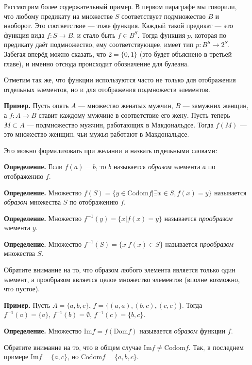 Рассмотрим более содержательный пример. В первом параграфе мы говорили, что любому предикату на множестве $S$ соответствует подмножество $B$ и наоборот. Это соответствие — тоже функция. Каждый такой предикат — это функция вида $f:S\to B$, и стало быть $f\in B^S$. Тогда функция $p$, которая по предикату даёт подмножество, ему соответствующее, имеет тип $p:B^S \to 2^S$. Забегая вперёд можно сказать, что $2=\{0, 1\}$ (это будет объяснено в третьей главе), и именно отсюда происходит обозначение для булеана.

Отметим так же, что функции используются часто не только для отображения отдельных элементов, но и для отображения подмножеств элементов.

{\bfseries Пример.} Пусть опять $A$ — множество женатых мужчин, $B$ — замужних женщин, а $f: A\to B$ ставит каждому мужчине в соответствие его жену. Пусть теперь $M\subset A$ — подмножество мужчин, работающих в Макдональдсе. Тогда $f(M)$ — это множество женщин, чьи мужья работают в Макдональдсе.

Это можно формализовать при желании и назвать отдельными словами:

{\bfseries Определение.} Если $f(a) = b$, то $b$ называется {\slshape образом} элемента $a$ по отображению $f$.

{\bfseries Определение.} Множество $f(S) = \{y\in \mathrm{Codom}f|\exists x \in S, f(x) = y \}$ называется {\slshape образом} множества $S$ по отображению $f$.

{\bfseries Определение.} Множество $f^{-1}(y) = \{x | f(x) = y \}$ называется {\slshape прообразом} элемента $y$.

{\bfseries Определение.} Множество $f^{-1}(S) = \{x | f(x) \in S \}$ называется {\slshape прообразом} множества $S$.

Обратите внимание на то, что образом любого элемента является только один элемент, а прообразом является целое множество элементов (вполне возможно, что пустое).

{\bfseries Пример.} Пусть $A = \{a, b, c\}$, $f = \{(a, a), (b, c), (c, c)\}$. Тогда $f^{-1}(a) = \{a\}$, $f^{-1}(b) = \emptyset$, $f^{-1}(c) = \{b, c\}$.

{\bfseries Определение.} Множество $\mathrm{Im} f = f(\mathrm{Dom} f)$ называется {\slshape образом} функции $f$.

Обратите внимание на то, что в общем случае $\mathrm{Im} f \not= \mathrm{Codom} f$. Так, в последнем примере $\mathrm{Im} f = \{a, c\}$, но $\mathrm{Codom}f = \{a, b, c\}$.

